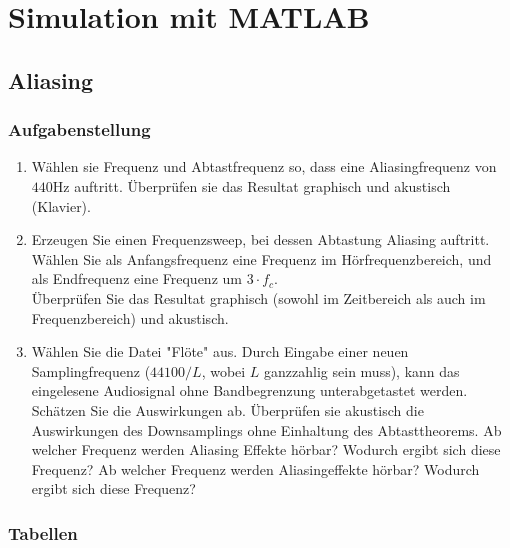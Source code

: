 \documentclass[12pt,a4paper,ngerman]{article}
\begin{document}


%
%

\section{Simulation mit MATLAB}

%
%
\subsection{Aliasing}
\subsubsection{Aufgabenstellung}
\begin{enumerate}
\item Wählen sie Frequenz und Abtastfrequenz so, dass eine Aliasingfrequenz von $440$Hz auftritt. Überprüfen sie das Resultat graphisch und akustisch (Klavier).
\item Erzeugen Sie einen Frequenzsweep, bei dessen Abtastung Aliasing auftritt. Wählen Sie als Anfangsfrequenz eine Frequenz im Hörfrequenzbereich, und als Endfrequenz eine Frequenz um $3 \cdot f_c$. \\
Überprüfen Sie das Resultat graphisch (sowohl im Zeitbereich als auch im Frequenzbereich) und akustisch. 
\item Wählen Sie die Datei "Flöte" aus. Durch Eingabe einer neuen Samplingfrequenz ($44100/L$, wobei $L$ ganzzahlig sein muss), kann das eingelesene Audiosignal ohne Bandbegrenzung unterabgetastet werden. Schätzen Sie die Auswirkungen ab. Überprüfen sie akustisch die Auswirkungen des Downsamplings ohne Einhaltung des Abtasttheorems. Ab welcher Frequenz werden Aliasing Effekte hörbar? Wodurch ergibt sich diese Frequenz? Ab welcher Frequenz werden Aliasingeffekte hörbar? Wodurch ergibt sich diese Frequenz?
\end{enumerate}



\subsubsection{Tabellen}
\end{document}
